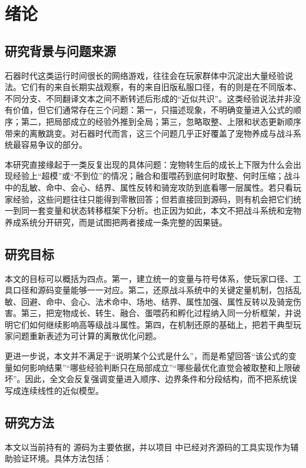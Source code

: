 \chapter{绪论}

\section{研究背景与问题来源}

石器时代这类运行时间很长的网络游戏，往往会在玩家群体中沉淀出大量经验说法。它们有的来自长期实战观察，有的来自旧版私服口径，有的则是在不同版本、不同分支、不同翻译文本之间不断转述后形成的“近似共识”。这类经验说法并非没有价值，但它们通常存在三个问题：第一，只描述现象，不明确变量进入公式的顺序；第二，把局部成立的经验外推到全局；第三，忽略取整、上限和状态更新顺序带来的离散跳变。对石器时代而言，这三个问题几乎正好覆盖了宠物养成与战斗系统最容易争议的部分。

本研究直接缘起于一类反复出现的具体问题：宠物转生后的成长上下限为什么会出现经验上“超模”或“不到位”的情况；融合和蛋喂药到底何时取整、何时压缩；战斗中的乱敏、命中、会心、结界、属性反转和骑宠攻防到底看哪一层属性。若只看玩家经验，这些问题往往只能得到零散回答；但若直接回到源码，则有机会把它们统一到同一套变量和状态转移框架下分析。也正因为如此，本文不把战斗系统和宠物养成系统分开研究，而是试图把两者接成一条完整的因果链。

\section{研究目标}

本文的目标可以概括为四点。第一，建立统一的变量与符号体系，使玩家口径、工具口径和源码变量能够一一对应。第二，还原战斗系统中的关键定量机制，包括乱敏、回避、命中、会心、法术命中、场地、结界、属性加强、属性反转以及骑宠伤害。第三，把宠物成长、转生、融合、蛋喂药和孵化过程纳入同一分析框架，并说明它们如何继续影响高等级战斗属性。第四，在机制还原的基础上，把若干典型玩家问题重新表述为可计算的离散优化问题。

更进一步说，本文并不满足于“说明某个公式是什么”，而是希望回答“该公式的变量如何影响结果”“哪些经验判断只在局部成立”“哪些最优化直觉会被取整和上限破坏”。因此，全文会反复强调变量进入顺序、边界条件和分段结构，而不把系统误写成连续线性的近似模型。

\section{研究方法}

本文以当前持有的  源码为主要依据，并以项目  中已经对齐源码的工具实现作为辅助验证环境。具体方法包括：

